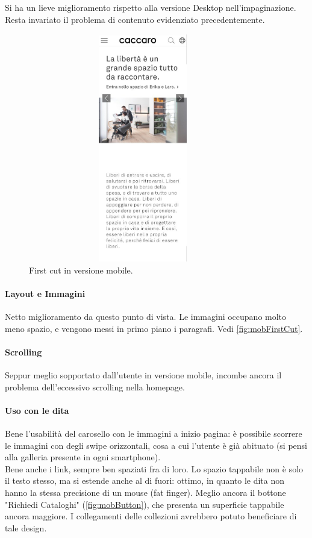 Si ha un lieve miglioramento rispetto alla versione Desktop nell'impaginazione. Resta invariato il problema di contenuto evidenziato precedentemente.

\begin{figure}[H]
	\centering
	\includegraphics[width=10cm,height=10cm,keepaspectratio]{sez/HomePage/img/mobile-firstcut.jpg}
	\caption{First cut in versione mobile.}
	\label{fig:mobFirstCut}
\end{figure}

\paragraph*{Layout e Immagini}
Netto miglioramento da questo punto di vista. Le immagini occupano molto meno spazio, e vengono messi in primo piano i paragrafi. Vedi \autoref{fig:mobFirstCut}.


\paragraph*{Scrolling}
Seppur meglio sopportato dall'utente in versione mobile, incombe ancora il problema dell'eccessivo scrolling nella homepage.

\paragraph*{Uso con le dita}
Bene l'usabilità del carosello con le immagini a inizio pagina: è possibile scorrere le immagini con degli swipe orizzontali, cosa a cui l'utente è già abituato (si pensi alla galleria presente in ogni smartphone).\\
Bene anche i link, sempre ben spaziati fra di loro. Lo spazio tappabile non è solo il testo stesso, ma si estende anche al di fuori: ottimo, in quanto le dita non hanno la stessa precisione di un mouse (fat finger). Meglio ancora il bottone "Richiedi Cataloghi" (\autoref{fig:mobButton}), che presenta un superficie tappabile ancora maggiore. I collegamenti delle collezioni avrebbero potuto beneficiare di tale design.

